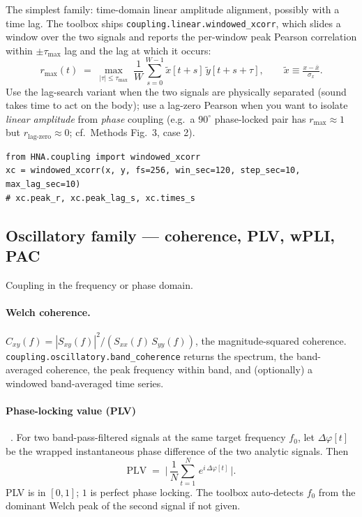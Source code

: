 \documentclass[11pt,a4paper]{article}
\begin{document}
The simplest family: time-domain linear amplitude alignment, possibly
with a time lag. The toolbox ships
\texttt{coupling.linear.windowed\_xcorr}, which slides a window over
the two signals and reports the per-window peak Pearson correlation
within $\pm \tau_{\max}$ lag and the lag at which it occurs:
\begin{equation}
\label{eq:xcorr}
r_{\max}(t) \;=\; \max_{|\tau|\le\tau_{\max}}\;
\frac{1}{W}\sum_{s=0}^{W-1} \tilde{x}[t + s]\,\tilde{y}[t + s + \tau],
\qquad \tilde{x}\equiv\tfrac{x-\bar x}{\sigma_x}.
\end{equation}
Use the lag-search variant when the two signals are physically separated
(sound takes time to act on the body); use a lag-zero Pearson when you
want to isolate \emph{linear amplitude} from \emph{phase} coupling
(e.g.\ a $90^\circ$ phase-locked pair has $r_{\max}\approx 1$ but
$r_{\text{lag-zero}}\approx 0$; cf.\ Methods Fig.~3, case 2).

\begin{lstlisting}
from HNA.coupling import windowed_xcorr
xc = windowed_xcorr(x, y, fs=256, win_sec=120, step_sec=10, max_lag_sec=10)
# xc.peak_r, xc.peak_lag_s, xc.times_s
\end{lstlisting}

\subsection{Oscillatory family --- coherence, PLV, wPLI, PAC}

Coupling in the frequency or phase domain.

\paragraph{Welch coherence.}
\(C_{xy}(f) = |S_{xy}(f)|^2 / (S_{xx}(f)\,S_{yy}(f))\), the
magnitude-squared coherence. \texttt{coupling.oscillatory.band\_coherence}
returns the spectrum, the band-averaged coherence, the peak frequency
within band, and (optionally) a windowed band-averaged time series.

\paragraph{Phase-locking value (PLV)}~\cite{Lachaux1999}.
For two band-pass-filtered signals at the same target frequency $f_0$,
let $\Delta\varphi[t]$ be the wrapped instantaneous phase difference of
the two analytic signals. Then
\begin{equation}
\text{PLV} \;=\; \biggl|\, \frac{1}{N}\sum_{t=1}^{N}\, e^{i\,\Delta\varphi[t]} \,\biggr|.
\end{equation}
PLV is in $[0,1]$; $1$ is perfect phase locking. The toolbox auto-detects
$f_0$ from the dominant Welch peak of the second signal if not given.
\end{document}
